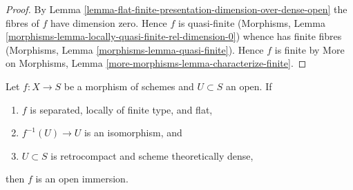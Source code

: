 \begin{proof}
By Lemma \ref{lemma-flat-finite-presentation-dimension-over-dense-open}
the fibres of $f$ have dimension zero.
Hence $f$ is quasi-finite
(Morphisms, Lemma \ref{morphisms-lemma-locally-quasi-finite-rel-dimension-0})
whence has finite fibres
(Morphisms, Lemma \ref{morphisms-lemma-quasi-finite}).
Hence $f$ is finite by
More on Morphisms, Lemma \ref{more-morphisms-lemma-characterize-finite}.
\end{proof}

\begin{lemma}
\label{lemma-zariski}
Let $f : X \to S$ be a morphism of schemes and $U \subset S$ an open. If
\begin{enumerate}
\item $f$ is separated, locally of finite type, and flat,
\item $f^{-1}(U) \to U$ is an isomorphism, and
\item $U \subset S$ is retrocompact and scheme theoretically dense,
\end{enumerate}
then $f$ is an open immersion.
\end{lemma}

